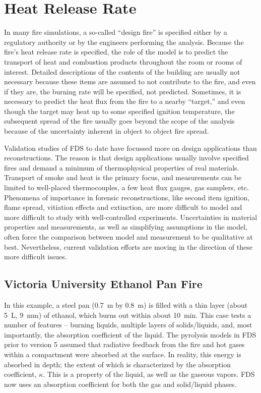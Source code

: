 
\chapter{Heat Release Rate}

In many fire simulations, a  so-called  ``design  fire'' is  specified
either by  a regulatory authority  or by the engineers  performing the
analysis. Because the  fire's heat release rate is  specified, the role of
the model is to predict  the transport of heat and combustion products
throughout  the room or  rooms of  interest. Detailed  descriptions of  the
contents of the building are usually not necessary because these items
are assumed to not contribute to the fire,  and even if they are, the burning rate
will be specified, not predicted.  Sometimes, it is necessary  to predict
the heat  flux from the fire  to a nearby ``target,''  and even though
the target  may heat up  to some specified ignition  temperature, the
subsequent spread  of the  fire usually goes  beyond the scope  of the
analysis because of the uncertainty  inherent in object to object fire
spread.

Validation  studies  of FDS  to  date  have  focussed more  on  design
applications   than  reconstructions.  The   reason  is   that  design
applications usually involve specified  fires and demand a minimum of
thermophysical properties  of real materials.  Transport  of smoke and
heat  is  the  primary  focus,  and measurements  can  be  limited  to
well-placed thermocouples, a few  heat flux gauges, gas samplers,
etc. Phenomena of importance in forensic reconstructions, like second
item  ignition, flame  spread, vitiation  effects and  extinction, are
more   difficult  to   model  and   more  difficult   to   study  with
well-controlled experiments. Uncertainties  in material properties and
measurements, as  well as simplifying assumptions in  the model, often
force the  comparison between model and measurement  to be qualitative
at best.  Nevertheless, current validation  efforts are moving  in the
direction of these more difficult issues.



\section{Victoria University Ethanol Pan Fire}
\label{ethanol_pan}

In this example, a steel pan (0.7~m by 0.8~m) is filled with a thin layer (about 5~L, 9~mm) of ethanol, which burns out within about 10~min. This case tests a number of features -- burning
liquids, multiple layers of solids/liquids, and, most importantly, the absorption coefficient of the liquid. The pyrolysis models in FDS prior to version 5
assumed that radiative feedback from the fire and hot gases within a compartment were absorbed at the surface. In reality, this energy is absorbed in
depth; the extent of which is characterized by the absorption coefficient, $\kappa$. This is a property of the liquid, as well as the gaseous vapors. FDS now uses
an absorption coefficient for both the gas and solid/liquid phases. 

